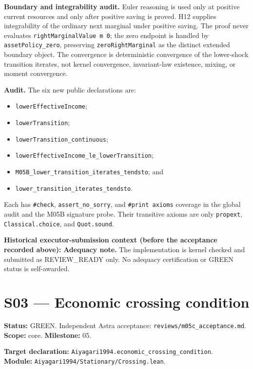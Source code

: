 \documentclass[
  11pt,
]{article}
\providecommand{\tightlist}{%
  \setlength{\itemsep}{0pt}\setlength{\parskip}{0pt}}
\let\LedgerOriginalTexttt\texttt
\renewcommand{\texttt}[1]{{\small\LedgerOriginalTexttt{#1}}}
\begin{document}
\textbf{Boundary and integrability audit.} Euler reasoning is used only
at positive current resources and only after positive saving is proved.
H12 supplies integrability of the ordinary next marginal under positive
saving. The proof never evaluates \texttt{rightMarginalValue\ m\ 0}; the
zero endpoint is handled by \texttt{assetPolicy\_zero}, preserving
\texttt{zeroRightMarginal} as the distinct extended boundary object. The
convergence is deterministic convergence of the lower-shock transition
iterates, not kernel convergence, invariant-law existence, mixing, or
moment convergence.

\textbf{Audit.} The six new public declarations are:

\begin{itemize}
\tightlist
\item
  \texttt{lowerEffectiveIncome};
\item
  \texttt{lowerTransition};
\item
  \texttt{lowerTransition\_continuous};
\item
  \texttt{lowerEffectiveIncome\_le\_lowerTransition};
\item
  \texttt{M05B\_lower\_transition\_iterates\_tendsto}; and
\item
  \texttt{lower\_transition\_iterates\_tendsto}.
\end{itemize}

Each has \texttt{\#check}, \texttt{assert\_no\_sorry}, and
\texttt{\#print\ axioms} coverage in the global audit and the M05B
signature probe. Their transitive axioms are only \texttt{propext},
\texttt{Classical.choice}, and \texttt{Quot.sound}.

\textbf{Historical executor-submission context (before the acceptance
recorded above):} \textbf{Adequacy note.} The implementation is kernel
checked and submitted as REVIEW\_READY only. No adequacy certification
or GREEN status is self-awarded.

\section{S03 --- Economic crossing
condition}\label{s03-economic-crossing-condition}

\textbf{Status:} GREEN. Independent Astra acceptance:
\texttt{reviews/m05c\_acceptance.md}. \textbf{Scope:} core.
\textbf{Milestone:} 05.

\textbf{Target declaration:}
\texttt{Aiyagari1994.economic\_crossing\_condition}.\\
\textbf{Module:} \texttt{Aiyagari1994/Stationary/Crossing.lean}.
\end{document}
